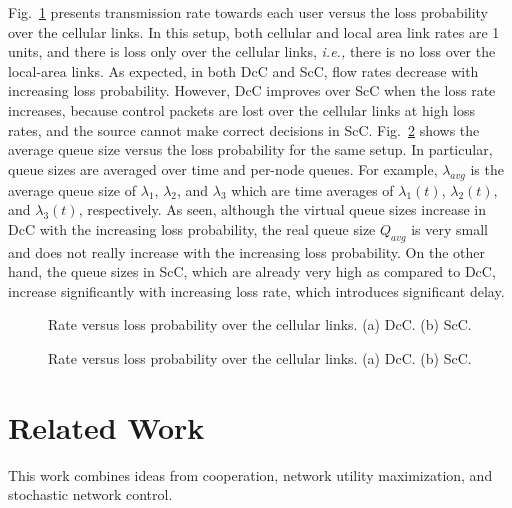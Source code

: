 \documentclass[conference]{IEEEtran}
\newcommand{\ie}{{\em i.e., }}
\begin{document}
Fig.~\ref{fig:sims_rateVsCellularLoss} presents transmission rate towards each user versus the loss probability over the cellular links.  In this setup, both cellular and local area link rates are 1 units, and there is loss only over the cellular links, \ie there is no loss over the local-area links. As expected, in both DcC and ScC, flow rates decrease with increasing loss probability. However, DcC improves over ScC when the loss rate increases, because control packets are lost over the cellular links at high loss rates, and the source cannot make correct decisions in ScC. Fig.~\ref{fig:sims_avgQueueSizeVsCellularLoss} shows the average queue size versus the loss probability for the same setup. In particular, queue sizes are averaged over time and per-node queues. For example, $\lambda_{avg}$ is the average queue size of $\lambda_1$, $\lambda_2$, and $\lambda_3$ which are time averages of $\lambda_1(t)$, $\lambda_2(t)$, and $\lambda_3(t)$, respectively. As seen, although the virtual queue sizes increase in DcC with the increasing loss probability, the real queue size $Q_{avg}$ is very small and does not really increase with the increasing loss probability. On the other hand, the queue sizes in ScC, which are already very high as compared to DcC, increase significantly with increasing loss rate, which introduces significant delay.

\begin{figure}[t!]
\centering
{}
\vspace{-5pt}
\caption{ Rate versus loss probability over the cellular links. (a) DcC. (b) ScC.}
\vspace{-5pt}
\label{fig:sims_rateVsCellularLoss}
\end{figure}


\begin{figure}[t!]
\centering
{}
\vspace{-5pt}
\caption{ Rate versus loss probability over the cellular links. (a) DcC. (b) ScC.}
\vspace{-5pt}
\label{fig:sims_avgQueueSizeVsCellularLoss}
\end{figure}

\section{\label{sec:related} Related Work}
This work combines ideas from cooperation, network utility maximization, and stochastic network control.
\end{document}
